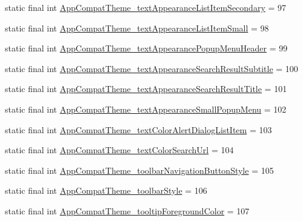 \begin{DoxyCompactItemize}
\item 
static final int \mbox{\hyperlink{classcom_1_1synnapps_1_1carouselview_1_1_r_1_1styleable_a071733ff5f151624f9c37328e1d6dec5}{App\+Compat\+Theme\+\_\+text\+Appearance\+List\+Item\+Secondary}} = 97
\item 
static final int \mbox{\hyperlink{classcom_1_1synnapps_1_1carouselview_1_1_r_1_1styleable_adaea2eb2478e507ca1aac1d9fb905db3}{App\+Compat\+Theme\+\_\+text\+Appearance\+List\+Item\+Small}} = 98
\item 
static final int \mbox{\hyperlink{classcom_1_1synnapps_1_1carouselview_1_1_r_1_1styleable_a2443e0c354eb9d6e5739dd2ba180e297}{App\+Compat\+Theme\+\_\+text\+Appearance\+Popup\+Menu\+Header}} = 99
\item 
static final int \mbox{\hyperlink{classcom_1_1synnapps_1_1carouselview_1_1_r_1_1styleable_aaa9f28bbbee1272147a548dae124d16f}{App\+Compat\+Theme\+\_\+text\+Appearance\+Search\+Result\+Subtitle}} = 100
\item 
static final int \mbox{\hyperlink{classcom_1_1synnapps_1_1carouselview_1_1_r_1_1styleable_a4210771487af4da2c62d959b9401e476}{App\+Compat\+Theme\+\_\+text\+Appearance\+Search\+Result\+Title}} = 101
\item 
static final int \mbox{\hyperlink{classcom_1_1synnapps_1_1carouselview_1_1_r_1_1styleable_a67d571e21d4a4d0b596bcaa9e42bf8a0}{App\+Compat\+Theme\+\_\+text\+Appearance\+Small\+Popup\+Menu}} = 102
\item 
static final int \mbox{\hyperlink{classcom_1_1synnapps_1_1carouselview_1_1_r_1_1styleable_ad13733d0a24da2cf65ae27175a0c7549}{App\+Compat\+Theme\+\_\+text\+Color\+Alert\+Dialog\+List\+Item}} = 103
\item 
static final int \mbox{\hyperlink{classcom_1_1synnapps_1_1carouselview_1_1_r_1_1styleable_ae36c43936f8fbd113818727612f1ae4a}{App\+Compat\+Theme\+\_\+text\+Color\+Search\+Url}} = 104
\item 
static final int \mbox{\hyperlink{classcom_1_1synnapps_1_1carouselview_1_1_r_1_1styleable_a47bb1d648a59ea10ccf7ac2aa11e3ef7}{App\+Compat\+Theme\+\_\+toolbar\+Navigation\+Button\+Style}} = 105
\item 
static final int \mbox{\hyperlink{classcom_1_1synnapps_1_1carouselview_1_1_r_1_1styleable_a13e33e40b6508edf34ed8bbefa1227d7}{App\+Compat\+Theme\+\_\+toolbar\+Style}} = 106
\item 
static final int \mbox{\hyperlink{classcom_1_1synnapps_1_1carouselview_1_1_r_1_1styleable_abec29f75ca26c6163ed7d7859b169901}{App\+Compat\+Theme\+\_\+tooltip\+Foreground\+Color}} = 107

\end{DoxyCompactItemize}
